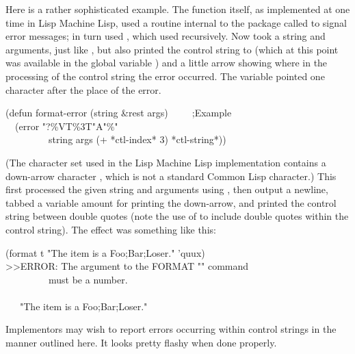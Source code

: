 \begin{flushdesc}
Here is a rather sophisticated example.
The  function itself,
as implemented at one time in Lisp Machine Lisp,
used a routine internal to the  package called  to
signal error messages;  in turn used , which used
 recursively.  Now  took a string and
arguments, just like , but also printed the control string
to  (which at this point was available
in the global variable ) and a little
arrow showing where in the processing of the control string the error
occurred.  The variable  pointed one character after the
place of the error.
\begin{lisp}
(defun format-error (string \&rest args)~~~~~;{\rm Example} \\
~~(error {\false} "{\Xtilde}?{\Xtilde}\%{\Xtilde}V{\Xatsign}T{\Xarrowdown}{\Xtilde}\%{\Xtilde}3{\Xatsign}T{\Xbackslash}"{\Xtilde}A{\Xbackslash}"{\Xtilde}\%" \\
~~~~~~~~~string args (+ *ctl-index* 3) *ctl-string*))
\end{lisp}
(The character set used in the Lisp Machine Lisp implementation contains a
down-arrow character \cd{\Xarrowdown}, which is not a standard Common Lisp
character.)  This first processed the given string and arguments using
, then output a newline, tabbed a variable amount for
printing the down-arrow, and printed the control string between
double quotes (note the use of  to include double quotes within
the control string).  The effect was something like this:
\begin{lisp}
(format t "The item is a {\Xtilde}{\Xlbracket}Foo{\Xtilde};Bar{\Xtilde};Loser{\Xtilde}{\Xrbracket}." 'quux) \\
>>ERROR: The argument to the FORMAT "{\Xtilde}{\Xlbracket}" command  \\
~~~~~~~~~must be a number. \\
~~~~~~~~~~~~~~~~~~~{\Xarrowdown} \\
~~~"The item is a {\Xtilde}{\Xlbracket}Foo{\Xtilde};Bar{\Xtilde};Loser{\Xtilde}{\Xrbracket}."
\end{lisp}

\beforenoterule
\begin{implementation}
Implementors may wish to report errors occurring
within  control strings in the manner outlined here.
It looks pretty flashy when done properly.
\end{implementation}
\afternoterule
\end{flushdesc}

